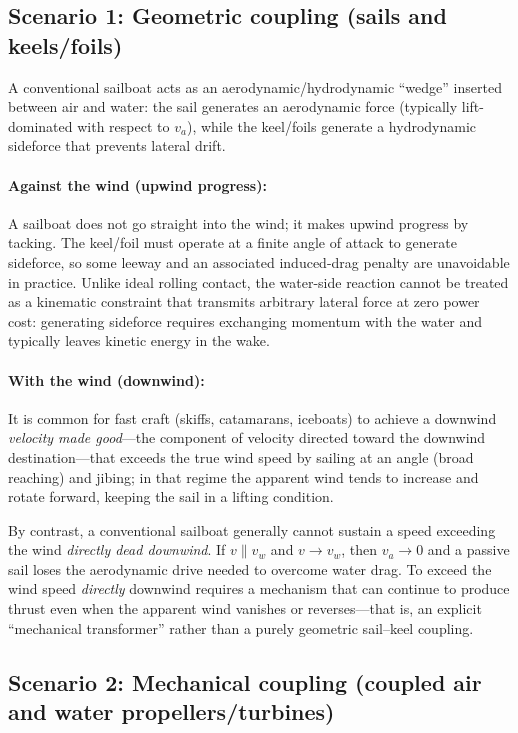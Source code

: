 \documentclass[a4paper]{article}
\begin{document}
\subsection{Scenario 1: Geometric coupling (sails and keels/foils)}

A conventional sailboat acts as an aerodynamic/hydrodynamic ``wedge'' inserted
between air and water: the sail generates an aerodynamic force (typically
lift-dominated with respect to $v_a$), while the keel/foils generate a
hydrodynamic sideforce that prevents lateral drift.

\paragraph*{Against the wind (upwind progress):}
A sailboat does not go straight into the wind; it makes upwind progress by
tacking.  The keel/foil must operate at a finite angle of attack to generate
sideforce, so some leeway and an associated induced-drag penalty are unavoidable
in practice.  Unlike ideal rolling contact, the water-side reaction cannot be
treated as a kinematic constraint that transmits arbitrary lateral force at
zero power cost: generating sideforce requires exchanging momentum with the
water and typically leaves kinetic energy in the wake.

\paragraph*{With the wind (downwind):}
It is common for fast craft (skiffs, catamarans, iceboats) to achieve a downwind
\emph{velocity made good}---the component of velocity directed toward the downwind destination---that exceeds the true wind speed by sailing at
an angle (broad reaching) and jibing; in that regime the apparent wind tends to
increase and rotate forward, keeping the sail in a lifting condition.

By contrast, a conventional sailboat generally cannot sustain a speed exceeding
the wind \emph{directly dead downwind}.  If $v \parallel v_w$
and $v \to v_w$, then $v_a \to 0$ and a passive sail loses
the aerodynamic drive needed to overcome water drag.  To exceed the wind speed
\emph{directly} downwind requires a mechanism that can continue to produce thrust
even when the apparent wind vanishes or reverses---that is, an explicit
``mechanical transformer'' rather than a purely geometric sail--keel coupling.

\subsection{Scenario 2: Mechanical coupling (coupled air and water propellers/turbines)}
\end{document}
